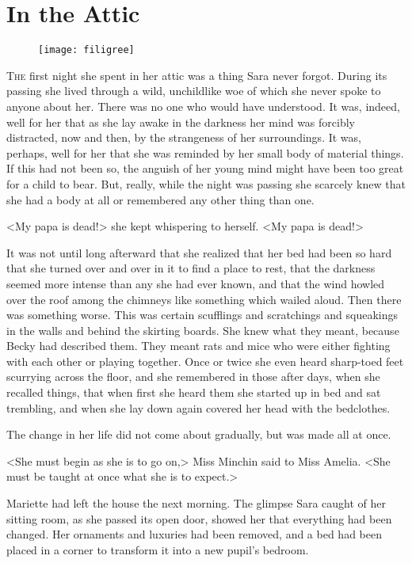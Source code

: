 \chapter{In the Attic}

\begin{figure}[t!]
\centering
\texttt{[image: filigree]}
\end{figure}

\lettrine[lines=5]{T}{he} first night she spent in her attic was a thing Sara never forgot. During its passing she lived through a wild, unchildlike woe of which she never spoke to anyone about her. There was no one who would have understood. It was, indeed, well for her that as she lay awake in the darkness her mind was forcibly distracted, now and then, by the strangeness of her surroundings. It was, perhaps, well for her that she was reminded by her small body of material things. If this had not been so, the anguish of her young mind might have been too great for a child to bear. But, really, while the night was passing she scarcely knew that she had a body at all or remembered any other thing than one.

<My papa is dead!> she kept whispering to herself. <My papa is dead!>

It was not until long afterward that she realized that her bed had been so hard that she turned over and over in it to find a place to rest, that the darkness seemed more intense than any she had ever known, and that the wind howled over the roof among the chimneys like something which wailed aloud. Then there was something worse. This was certain scufflings and scratchings and squeakings in the walls and behind the skirting boards. She knew what they meant, because Becky had described them. They meant rats and mice who were either fighting with each other or playing together. Once or twice she even heard sharp-toed feet scurrying across the floor, and she remembered in those after days, when she recalled things, that when first she heard them she started up in bed and sat trembling, and when she lay down again covered her head with the bedclothes.

The change in her life did not come about gradually, but was made all at once.

<She must begin as she is to go on,> Miss Minchin said to Miss Amelia. <She must be taught at once what she is to expect.>

Mariette had left the house the next morning. The glimpse Sara caught of her sitting room, as she passed its open door, showed her that everything had been changed. Her ornaments and luxuries had been removed, and a bed had been placed in a corner to transform it into a new pupil's bedroom.

